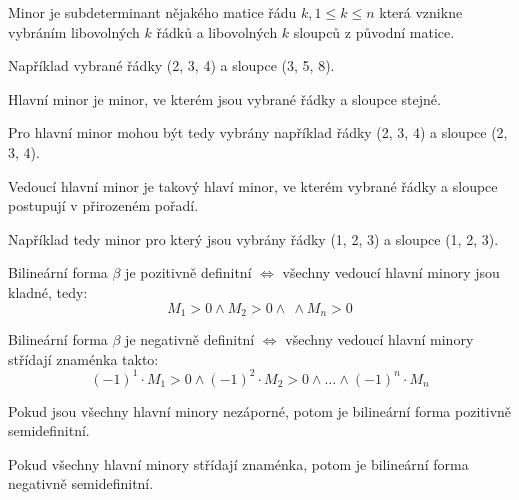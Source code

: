 \begin{definition}[Minor]
    Minor je subdeterminant nějakého matice řádu $k, 1 \leq k \leq n$ která vznikne vybráním
    libovolných $k$ řádků a libovolných $k$ sloupců z původní matice.

    Například vybrané řádky (2, 3, 4) a sloupce (3, 5, 8).
\end{definition}

\begin{definition}
    Hlavní minor je minor, ve kterém jsou vybrané řádky a sloupce stejné.

    Pro hlavní minor mohou být tedy vybrány například řádky (2, 3, 4) a sloupce (2, 3, 4).
\end{definition}

\begin{definition}
    Vedoucí hlavní minor je takový hlaví minor, ve kterém vybrané řádky a sloupce
    postupují v přirozeném pořadí.

    Například tedy minor pro který jsou vybrány řádky (1, 2, 3) a sloupce (1, 2, 3).
\end{definition}

\begin{theorem}
    Bilineární forma $\beta$ je pozitivně definitní $\Leftrightarrow$ všechny
    vedoucí hlavní minory jsou kladné, tedy:
    $$M_1 > 0 \wedge M_2 > 0 \wedge \ \wedge M_n > 0$$

    Bilineární forma $\beta$ je negativně definitní $\Leftrightarrow$ všechny
    vedoucí hlavní minory střídají znaménka takto:
    $$(-1)^1\cdot M_1 > 0 \wedge (-1)^2 \cdot M_2 > 0 \wedge \ldots \wedge (-1)^n \cdot M_n$$
\end{theorem}

Pokud jsou všechny hlavní minory nezáporné, potom je bilineární forma pozitivně semidefinitní.

Pokud všechny hlavní minory střídají znaménka, potom je bilineární forma negativně semidefinitní.

